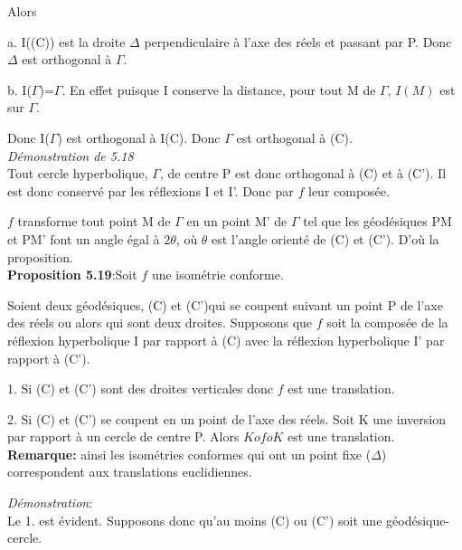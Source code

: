 \documentclass[a4paper, 12pt, twoside]{book}
\begin{document}
 Alors\

a. I((C)) est la droite $\Delta$ perpendiculaire à l'axe des réels et passant par P. Donc $\Delta$ est orthogonal à $\Gamma$.\

b. I($\Gamma$)=$\Gamma$. En effet puisque I conserve la distance, pour tout M de $\Gamma$, $I(M)$ est sur $\Gamma$.\

Donc I($\Gamma$) est orthogonal à I(C). Donc $\Gamma$ est orthogonal à (C).\\


\textit{Démonstration de 5.18}\\

Tout cercle  hyperbolique, $\Gamma$, de centre P est donc orthogonal à (C) et à (C'). Il est donc conservé par les  réflexions I et I'. Donc par $f$ leur composée. \

$f$ transforme tout point M de $\Gamma$ en un point M' de $\Gamma$ tel que les géodésiques PM et PM' font un angle égal à $2\theta$, où $\theta$ est l'angle orienté de (C) et (C'). D'où la proposition.\\
  
 


  
  
  \textbf{Proposition 5.19}:Soit $f$ une isométrie conforme.\
  
   Soient  deux géodésiques, (C) et (C')qui se coupent suivant un point P de l'axe des réels ou alors qui sont deux droites. Supposons que $f$ soit la composée de la réflexion hyperbolique I par rapport à (C) avec la réflexion hyperbolique I' par rapport à (C'). \
   
   1. Si (C) et (C')  sont des droites verticales donc $f$ est une translation.\
   
  
  2. Si (C) et (C') se coupent en un point de l'axe des réels. Soit K une inversion par rapport à un cercle de centre P. Alors $KofoK$ est une translation.\\
  
  \textbf{Remarque:} ainsi les isométries conformes qui ont un point fixe ($\Delta$) correspondent aux translations euclidiennes. 
  
  \textit{Démonstration}: \\
  
  Le 1. est évident. Supposons donc qu'au moins (C) ou (C') soit une géodésique-cercle.\\
  
\end{document}
